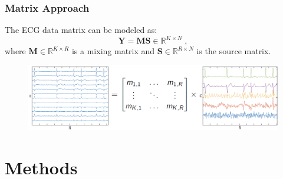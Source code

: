 \documentclass{beamer}
\begin{document}
	\begin{frame}
		\frametitle{Matrix Approach}
	
		The ECG data matrix can be modeled as:
		\begin{equation}
			\textbf{Y} = \textbf{MS} \in \mathbb{R}^{K \times N} \; ,
		\end{equation}
		where ${\textbf{M}} \in {\mathbb{R}}^{K \times R}$ is a mixing matrix and $\textbf{S} \in {\mathbb{R}}^{R \times N}$ is the source matrix.	
		\vspace{-0.4cm}
		\begin{figure}[htb]
			\centering
			\includegraphics[scale=0.5]{bss_fig.png}
		\end{figure}
	\end{frame}
		
\section{Methods}
\end{document}
